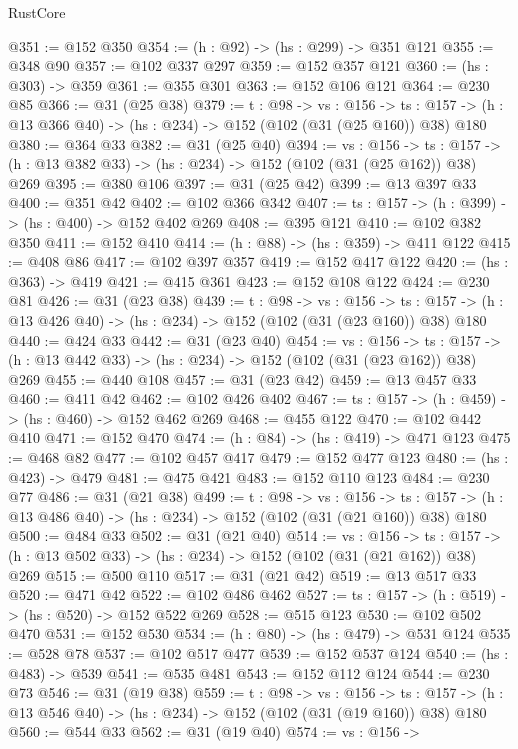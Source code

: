 \begin{lexlean}{RustCore}
\begin{coremodule}
@351 := @152 @350
@354 := (h : @92) -> (hs : @299) -> @351 @121
@355 := @348 @90
@357 := @102 @337 @297
@359 := @152 @357 @121
@360 := (hs : @303) -> @359
@361 := @355 @301
@363 := @152 @106 @121
@364 := @230 @85
@366 := @31 (@25 @38)
@379 := {t : @98} ->
  {vs : @156} ->
  {ts : @157} -> (h : @13 @366 @40) -> (hs : @234) -> @152 (@102 (@31 (@25 @160)) @38) @180
@380 := @364 @33
@382 := @31 (@25 @40)
@394 := {vs : @156} ->
  {ts : @157} -> (h : @13 @382 @33) -> (hs : @234) -> @152 (@102 (@31 (@25 @162)) @38) @269
@395 := @380 @106
@397 := @31 (@25 @42)
@399 := @13 @397 @33
@400 := @351 @42
@402 := @102 @366 @342
@407 := {ts : @157} -> (h : @399) -> (hs : @400) -> @152 @402 @269
@408 := @395 @121
@410 := @102 @382 @350
@411 := @152 @410
@414 := (h : @88) -> (hs : @359) -> @411 @122
@415 := @408 @86
@417 := @102 @397 @357
@419 := @152 @417 @122
@420 := (hs : @363) -> @419
@421 := @415 @361
@423 := @152 @108 @122
@424 := @230 @81
@426 := @31 (@23 @38)
@439 := {t : @98} ->
  {vs : @156} ->
  {ts : @157} -> (h : @13 @426 @40) -> (hs : @234) -> @152 (@102 (@31 (@23 @160)) @38) @180
@440 := @424 @33
@442 := @31 (@23 @40)
@454 := {vs : @156} ->
  {ts : @157} -> (h : @13 @442 @33) -> (hs : @234) -> @152 (@102 (@31 (@23 @162)) @38) @269
@455 := @440 @108
@457 := @31 (@23 @42)
@459 := @13 @457 @33
@460 := @411 @42
@462 := @102 @426 @402
@467 := {ts : @157} -> (h : @459) -> (hs : @460) -> @152 @462 @269
@468 := @455 @122
@470 := @102 @442 @410
@471 := @152 @470
@474 := (h : @84) -> (hs : @419) -> @471 @123
@475 := @468 @82
@477 := @102 @457 @417
@479 := @152 @477 @123
@480 := (hs : @423) -> @479
@481 := @475 @421
@483 := @152 @110 @123
@484 := @230 @77
@486 := @31 (@21 @38)
@499 := {t : @98} ->
  {vs : @156} ->
  {ts : @157} -> (h : @13 @486 @40) -> (hs : @234) -> @152 (@102 (@31 (@21 @160)) @38) @180
@500 := @484 @33
@502 := @31 (@21 @40)
@514 := {vs : @156} ->
  {ts : @157} -> (h : @13 @502 @33) -> (hs : @234) -> @152 (@102 (@31 (@21 @162)) @38) @269
@515 := @500 @110
@517 := @31 (@21 @42)
@519 := @13 @517 @33
@520 := @471 @42
@522 := @102 @486 @462
@527 := {ts : @157} -> (h : @519) -> (hs : @520) -> @152 @522 @269
@528 := @515 @123
@530 := @102 @502 @470
@531 := @152 @530
@534 := (h : @80) -> (hs : @479) -> @531 @124
@535 := @528 @78
@537 := @102 @517 @477
@539 := @152 @537 @124
@540 := (hs : @483) -> @539
@541 := @535 @481
@543 := @152 @112 @124
@544 := @230 @73
@546 := @31 (@19 @38)
@559 := {t : @98} ->
  {vs : @156} ->
  {ts : @157} -> (h : @13 @546 @40) -> (hs : @234) -> @152 (@102 (@31 (@19 @160)) @38) @180
@560 := @544 @33
@562 := @31 (@19 @40)
@574 := {vs : @156} ->

\end{coremodule}
\end{lexlean}
